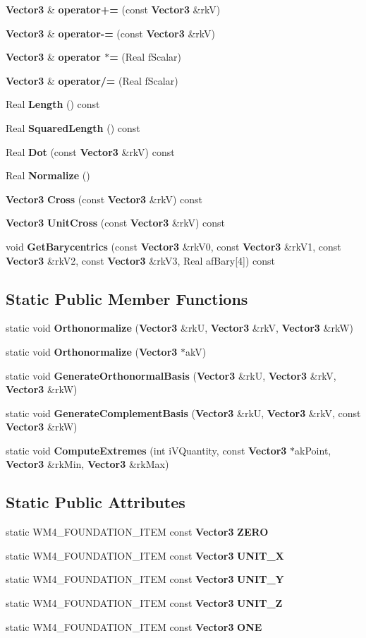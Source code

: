 \begin{CompactItemize}
\item 
{\bf Vector3} \& {\bf operator+=} (const {\bf Vector3} \&rk\-V)
\item 
{\bf Vector3} \& {\bf operator-=} (const {\bf Vector3} \&rk\-V)
\item 
{\bf Vector3} \& {\bf operator $\ast$=} (Real f\-Scalar)
\item 
{\bf Vector3} \& {\bf operator/=} (Real f\-Scalar)
\item 
Real {\bf Length} () const
\item 
Real {\bf Squared\-Length} () const
\item 
Real {\bf Dot} (const {\bf Vector3} \&rk\-V) const
\item 
Real {\bf Normalize} ()
\item 
{\bf Vector3} {\bf Cross} (const {\bf Vector3} \&rk\-V) const
\item 
{\bf Vector3} {\bf Unit\-Cross} (const {\bf Vector3} \&rk\-V) const
\item 
void {\bf Get\-Barycentrics} (const {\bf Vector3} \&rk\-V0, const {\bf Vector3} \&rk\-V1, const {\bf Vector3} \&rk\-V2, const {\bf Vector3} \&rk\-V3, Real af\-Bary[4]) const
\end{CompactItemize}
\subsection*{Static Public Member Functions}
\begin{CompactItemize}
\item 
static void {\bf Orthonormalize} ({\bf Vector3} \&rk\-U, {\bf Vector3} \&rk\-V, {\bf Vector3} \&rk\-W)
\item 
static void {\bf Orthonormalize} ({\bf Vector3} $\ast$ak\-V)
\item 
static void {\bf Generate\-Orthonormal\-Basis} ({\bf Vector3} \&rk\-U, {\bf Vector3} \&rk\-V, {\bf Vector3} \&rk\-W)
\item 
static void {\bf Generate\-Complement\-Basis} ({\bf Vector3} \&rk\-U, {\bf Vector3} \&rk\-V, const {\bf Vector3} \&rk\-W)
\item 
static void {\bf Compute\-Extremes} (int i\-VQuantity, const {\bf Vector3} $\ast$ak\-Point, {\bf Vector3} \&rk\-Min, {\bf Vector3} \&rk\-Max)
\end{CompactItemize}
\subsection*{Static Public Attributes}
\begin{CompactItemize}
\item 
static WM4\_\-FOUNDATION\_\-ITEM const {\bf Vector3} {\bf ZERO}
\item 
static WM4\_\-FOUNDATION\_\-ITEM const {\bf Vector3} {\bf UNIT\_\-X}
\item 
static WM4\_\-FOUNDATION\_\-ITEM const {\bf Vector3} {\bf UNIT\_\-Y}
\item 
static WM4\_\-FOUNDATION\_\-ITEM const {\bf Vector3} {\bf UNIT\_\-Z}
\item 
static WM4\_\-FOUNDATION\_\-ITEM const {\bf Vector3} {\bf ONE}
\end{CompactItemize}

